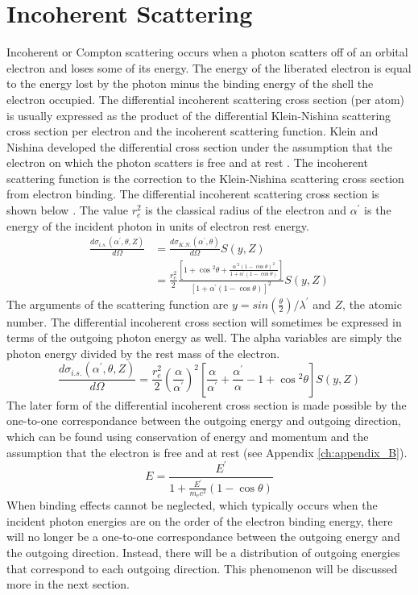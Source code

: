 \section{Incoherent Scattering}
Incoherent or Compton scattering occurs when a photon scatters off of an orbital
electron and loses some of its energy. The energy of the liberated electron
is equal to the energy lost by the photon minus the binding energy of the
shell the electron occupied. The differential incoherent scattering cross
section (per atom) is usually expressed as the product of the differential 
Klein-Nishina scattering cross section per electron and the incoherent 
scattering function. Klein and Nishina developed the differential cross section
under the assumption that the electron on which the photon scatters is free 
and at rest \citep{klein_uber_1929}. The incoherent scattering function is the 
correction to the Klein-Nishina scattering cross section from electron binding. 
The differential incoherent scattering cross section is shown below 
\citep{lux_monte_1991}. The value $r_e^2$ is the classical radius of the 
electron and $\alpha^{'}$ is the energy of the incident photon in units of 
electron rest energy.
\begin{align}
  \frac{d\sigma_{i.s.}(\alpha^{'},\theta,Z)}{d\Omega} & = 
  \frac{d\sigma_{K.N.}(\alpha^{'},\theta)}{d\Omega}S(y,Z) \nonumber \\
  & = \frac{r_e^2}{2}
  \frac{\left[1 + \cos{^{2}\theta} + \frac{\alpha^{'2}(1-\cos{\theta})^2}
                                  {1 + \alpha^{'}(1-\cos{\theta})}\right] }
  {\left[1 + \alpha^{'}(1-\cos{\theta}) \right]^2}
  S(y,Z)
  \label{eq:incoh_scat_theta}
\end{align}
The arguments of the scattering function are 
$y = sin(\frac{\theta}{2})/\lambda^{'}$ and $Z$, the atomic number. The 
differential incoherent cross section will sometimes be expressed in terms of 
the outgoing photon energy as well. The alpha variables are simply the photon
energy divided by the rest mass of the electron.
\begin{equation}
  \frac{d\sigma_{i.s.}(\alpha^{'},\theta,Z)}{d\Omega} = \frac{r_e^2}{2}
  \left(\frac{\alpha}{\alpha^{'}} \right)^2
  \left[ \frac{\alpha}{\alpha^{'}} + \frac{\alpha^{'}}{\alpha} - 1 + 
    \cos{^2\theta} \right] S(y,Z)
\end{equation}
The later form of the differential incoherent cross section is made possible 
by the one-to-one correspondance between the outgoing energy and outgoing 
direction, which can be found using conservation of energy and momentum and the 
assumption that the electron is free and at rest (see Appendix 
\ref{ch:appendix_B}). 
\begin{equation}
  E = \frac{E^{'}}{1 + \frac{E^{'}}{m_ec^2}(1 - \cos{\theta})}
\end{equation}
When binding effects cannot be neglected, which typically occurs when the 
incident photon energies are on the order of the electron binding energy, there 
will no longer be a one-to-one correspondance between the outgoing energy and 
the outgoing direction. Instead, there will be a distribution of outgoing 
energies that correspond to each outgoing direction. This phenomenon will be 
discussed more in the next section.

